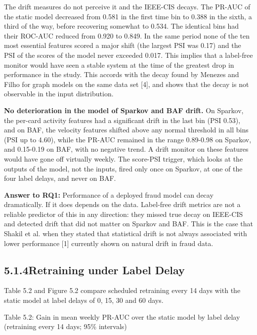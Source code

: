 \documentclass[11pt,letterpaper]{report}
\begin{document}
The drift measures do not perceive it and the IEEE-CIS decays. The PR-AUC of the static model decreased from 0.581 in the first time bin to 0.388 in the sixth, a third of the way, before recovering somewhat to 0.534. The identical bins had their ROC-AUC reduced from 0.920 to 0.849. In the same period none of the ten most essential features scored a major shift (the largest PSI was 0.17) and the PSI of the scores of the model never exceeded 0.017. This implies that a label-free monitor would have seen a stable system at the time of the greatest drop in performance in the study. This accords with the decay found by Menezes and Filho for graph models on the same data set [4], and shows that the decay is not observable in the input distribution.

\textbf{No deterioration in the model of Sparkov and BAF drift.} On Sparkov, the per-card activity features had a significant drift in the last bin (PSI 0.53), and on BAF, the velocity features shifted above any normal threshold in all bins (PSI up to 4.60), while the PR-AUC remained in the range 0.89-0.98 on Sparkov, and 0.15-0.19 on BAF, with no negative trend. A drift monitor on these features would have gone off virtually weekly. The score-PSI trigger, which looks at the outputs of the model, not the inputs, fired only once on Sparkov, at one of the four label delays, and never on BAF.

\textbf{Answer to RQ1:} Performance of a deployed fraud model can decay dramatically. If it does depends on the data. Label-free drift metrics are not a reliable predictor of this in any direction: they missed true decay on IEEE-CIS and detected drift that did not matter on Sparkov and BAF. This is the case that Shakil et al. when they stated that statistical drift is not always associated with lower performance [1] currently shown on natural drift in fraud data.

\subsection*{5.1.4\quad Retraining under Label Delay}

Table 5.2 and Figure 5.2 compare scheduled retraining every 14 days with the static model at label delays of 0, 15, 30 and 60 days.

\begin{center}\small Table 5.2: Gain in mean weekly PR-AUC over the static model by label delay (retraining every 14 days; 95\% intervals)\end{center}
\vspace{-1.2em}
\end{document}
